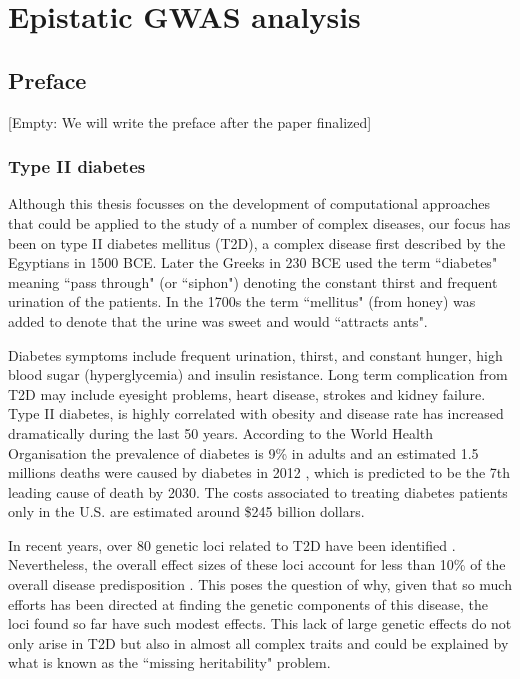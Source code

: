 
\chapter{Epistatic GWAS analysis\label{ch:gwas}}

\section{Preface}

{ \huge [Empty: We will write the preface after the paper finalized]}

\subsection{Type II diabetes}

Although this thesis focusses on the development of computational approaches that could be applied to the study of a number of complex diseases, our focus has been on type II diabetes mellitus (T2D), a complex disease first described by the Egyptians in 1500 BCE. Later the Greeks in 230 BCE used the term ``diabetes" meaning ``pass through" (or ``siphon") denoting the constant thirst and frequent urination of the patients. In the 1700s the term ``mellitus" (from honey) was added to denote that the urine was sweet and would ``attracts ants".

Diabetes symptoms include frequent urination, thirst, and constant hunger, high blood sugar (hyperglycemia) and insulin resistance. Long term complication from T2D may include eyesight problems, heart disease, strokes and kidney failure. Type II diabetes, is highly correlated with obesity and disease rate has increased dramatically during the last 50 years. According to the World Health Organisation the prevalence of diabetes is 9\% in adults and an estimated 1.5 millions deaths were caused by diabetes in 2012 \cite{guariguata2014global}, which is predicted to be the 7th leading cause of death by 2030. The costs associated to treating diabetes patients only in the U.S. are estimated around \$245 billion dollars.

In recent years, over 80 genetic loci related to T2D have been identified \cite{morris2012large, consortium2014genome}. Nevertheless, the overall effect sizes of these loci account for less than 10\% of the overall disease predisposition \cite{manolio2009finding}. This poses the question of why, given that so much efforts has been directed at finding the genetic components of this disease, the loci found so far have such modest effects. This lack of large genetic effects do not only arise in T2D but also in almost all complex traits and could be explained by what is known as the ``missing heritability" problem.


